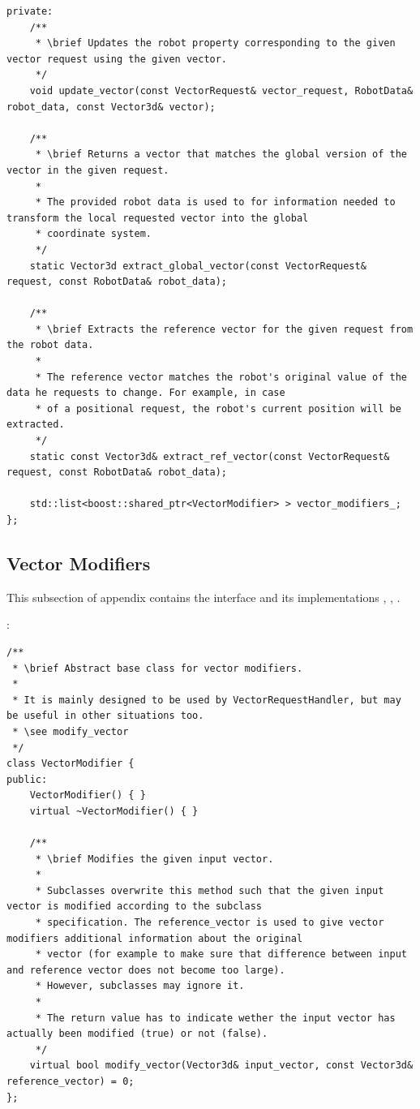 \begin{appendix}
\begin{lstlisting}
private:
	/**
	 * \brief Updates the robot property corresponding to the given vector request using the given vector.
	 */
    void update_vector(const VectorRequest& vector_request, RobotData& robot_data, const Vector3d& vector);

	/**
	 * \brief Returns a vector that matches the global version of the vector in the given request.
	 *
	 * The provided robot data is used to for information needed to transform the local requested vector into the global
	 * coordinate system.
	 */
	static Vector3d extract_global_vector(const VectorRequest& request, const RobotData& robot_data);

	/**
	 * \brief Extracts the reference vector for the given request from the robot data.
	 *
	 * The reference vector matches the robot's original value of the data he requests to change. For example, in case
	 * of a positional request, the robot's current position will be extracted.
	 */
	static const Vector3d& extract_ref_vector(const VectorRequest& request, const RobotData& robot_data);

	std::list<boost::shared_ptr<VectorModifier> > vector_modifiers_;
};
\end{lstlisting}

\subsection{Vector Modifiers}\label{appendix:vectormodifiers}
This subsection of appendix  contains the  interface and its implementations , , .

:
\begin{lstlisting}
/**
 * \brief Abstract base class for vector modifiers.
 *
 * It is mainly designed to be used by VectorRequestHandler, but may be useful in other situations too.
 * \see modify_vector
 */
class VectorModifier {
public:
	VectorModifier() { }
	virtual ~VectorModifier() { }

	/**
	 * \brief Modifies the given input vector.
	 *
	 * Subclasses overwrite this method such that the given input vector is modified according to the subclass
	 * specification. The reference_vector is used to give vector modifiers additional information about the original
	 * vector (for example to make sure that difference between input and reference vector does not become too large).
	 * However, subclasses may ignore it.
	 *
	 * The return value has to indicate wether the input vector has actually been modified (true) or not (false).
	 */
	virtual bool modify_vector(Vector3d& input_vector, const Vector3d& reference_vector) = 0;
};
\end{lstlisting}


\end{appendix}
